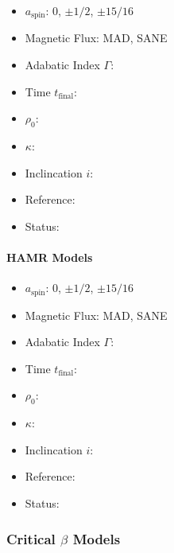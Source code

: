 \documentclass[twocolumn,twocolappendix,tighten,dvipsnames,linenumbers]{aastex63}
\begin{document}
\begin{itemize}
\item $a_\mathrm{spin}$: 0, $\pm1/2$, $\pm15/16$
\item Magnetic Flux: MAD, SANE
\item Adabatic Index $\Gamma$:
\item Time $t_\mathrm{final}$:
\item $\rho_0$:
\item $\kappa$:
\item Inclincation $i$:
\item Reference:
\item Status:
\end{itemize}

\paragraph{HAMR Models}

\begin{itemize}
\item $a_\mathrm{spin}$: 0, $\pm1/2$, $\pm15/16$
\item Magnetic Flux: MAD, SANE
\item Adabatic Index $\Gamma$:
\item Time $t_\mathrm{final}$:
\item $\rho_0$:
\item $\kappa$:
\item Inclincation $i$:
\item Reference:
\item Status:
\end{itemize}

\subsubsection{Critical $\beta$ Models}
\end{document}
